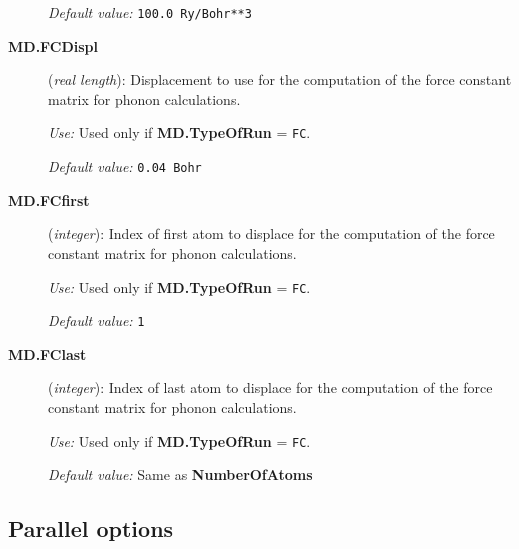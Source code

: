 \begin{description}
{\it Default value:}  {\tt 100.0 Ry/Bohr**3}
        
\item[{\bf MD.FCDispl}] ({\it real length}): 
Displacement to use for the computation of the force constant
matrix for phonon calculations.

{\it Use:} Used only if {\bf MD.TypeOfRun} = {\tt FC}.

{\it Default value:}  {\tt 0.04 Bohr}

\item[{\bf MD.FCfirst}] ({\it integer}): 
Index of first atom to displace for the computation of the force constant
matrix for phonon calculations.

{\it Use:} Used only if {\bf MD.TypeOfRun} = {\tt FC}.

{\it Default value:}  {\tt 1}

\item[{\bf MD.FClast}] ({\it integer}): 
Index of last atom to displace for the computation of the force constant
matrix for phonon calculations.

{\it Use:} Used only if {\bf MD.TypeOfRun} = {\tt FC}.

{\it Default value:}  Same as {\bf NumberOfAtoms}

\end{description}


\vspace{5pt}
\subsection{Parallel options}

